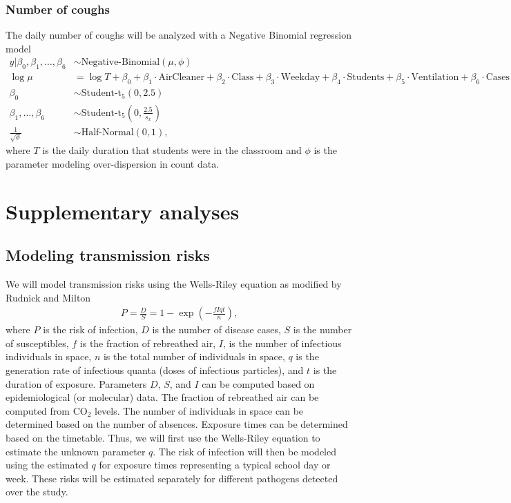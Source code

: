 \documentclass{article}
\begin{document}
\subsubsection{Number of coughs}

The daily number of coughs will be analyzed with a Negative Binomial regression model
\begin{align*}
    y | \beta_0, \beta_1, \dots, \beta_6 &\sim \text{Negative-Binomial}(\mu,\phi) \\
    \log \mu &= \log T + \beta_0 + \beta_1 \cdot \text{AirCleaner} + \beta_2 \cdot \text{Class} + \beta_3 \cdot \text{Weekday} + \beta_4 \cdot \text{Students} + \beta_5 \cdot \text{Ventilation} + \beta_6 \cdot \text{Cases} \\
    \beta_0 &\sim \text{Student-t}_5(0, 2.5) \\
    \beta_1, \dots, \beta_6 &\sim \text{Student-t}_5\left(0, \frac{2.5}{s_{x}}\right) \\
    \frac{1}{\sqrt{\phi}} &\sim \text{Half-Normal}(0,1),
\end{align*}
where $T$ is the daily duration that students were in the classroom and $\phi$ is the parameter modeling over-dispersion in count data. 

\section{Supplementary analyses}

\subsection{Modeling transmission risks}

We will model transmission risks using the Wells-Riley equation\cite{Wells1963} as modified by Rudnick and Milton\cite{Rudnick2003} 
\begin{align*}
    P = \frac{D}{S} = 1 - \exp\left(-\frac{fIqt}{n}\right),
\end{align*}
where $P$ is the risk of infection, $D$ is the number of disease cases, $S$ is the number of susceptibles, $f$ is the fraction of rebreathed air, $I$, is the number of infectious individuals in space, $n$ is the total number of individuals in space, $q$ is the generation rate of infectious quanta (doses of infectious particles), and $t$ is the duration of exposure. Parameters $D$, $S$, and $I$ can be computed based on epidemiological (or molecular) data. The fraction of rebreathed air can be computed from CO$_2$ levels. The number of individuals in space can be determined based on the number of absences. Exposure times can be determined based on the timetable. Thus, we will first use the Wells-Riley equation to estimate the unknown parameter $q$. The risk of infection will then be modeled using the estimated $q$ for exposure times representing a typical school day or week. These risks will be estimated separately for different pathogens detected over the study.  
\end{document}
